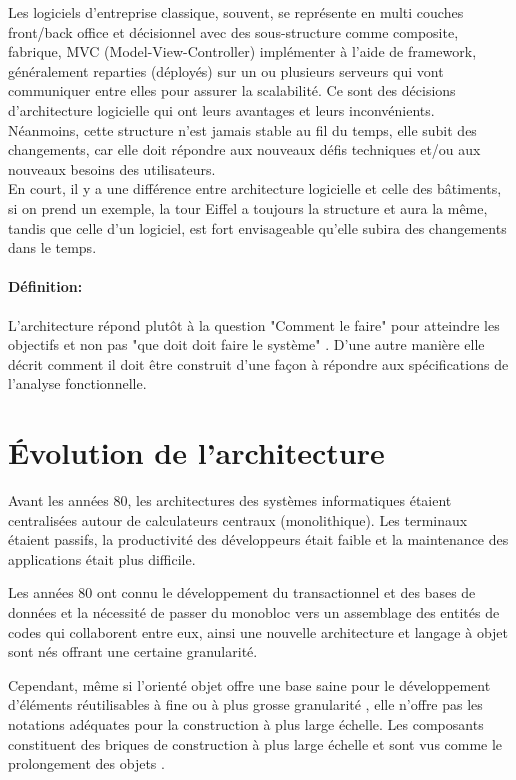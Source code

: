 \documentclass[12pt, a4paper, openany]{report}
\begin{document}
 Les logiciels d’entreprise classique, souvent, se représente en multi couches front/back office et décisionnel avec des sous-structure comme composite, fabrique, MVC (Model-View-Controller) implémenter à l’aide de framework, généralement reparties (déployés) sur un ou plusieurs serveurs qui vont communiquer entre elles pour assurer la scalabilité. Ce sont des décisions d’architecture logicielle qui ont leurs avantages et leurs inconvénients.\\
 
 Néanmoins, cette structure n’est jamais stable au fil du temps, elle subit des changements, car elle doit répondre aux nouveaux défis techniques et/ou aux nouveaux besoins des utilisateurs.\\
  
 En court, il y a une différence entre architecture logicielle et celle des bâtiments, si on prend un exemple, la tour Eiffel a toujours la structure et aura la même, tandis que celle d’un logiciel, est fort envisageable qu’elle subira des changements dans le temps.
 
 \paragraph{Définition:}
 L’architecture répond plutôt à la question "Comment le faire" \cite{refbibArch} pour atteindre les objectifs et non pas "que doit doit faire le système" \cite{refbibArch} . D’une autre manière elle décrit comment il doit être construit d’une façon à répondre aux spécifications de l’analyse fonctionnelle.
 
 \section{Évolution de l'architecture}
  Avant les années 80, les architectures des systèmes informatiques étaient centralisées autour de calculateurs centraux (monolithique). Les terminaux étaient passifs, la productivité des développeurs était faible et la maintenance des applications était plus difficile.
  
  Les années 80 ont connu le développement du transactionnel et des bases de données et la nécessité de passer du monobloc vers un assemblage des entités de codes qui collaborent entre eux, ainsi une nouvelle architecture et langage à objet sont nés offrant une certaine granularité.
  
  Cependant, même si l’orienté objet offre une base saine pour le développement d’éléments réutilisables à fine ou à plus grosse granularité \cite{refbib1} , elle n’offre pas les notations adéquates pour la construction à plus large échelle. Les composants constituent des briques de construction à plus large échelle et sont vus comme le prolongement des objets \cite{refbib2}.
  
\end{document}
